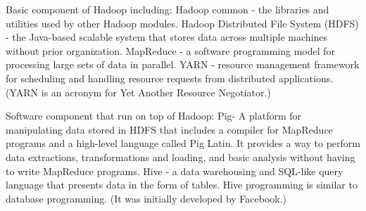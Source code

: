 Basic component of Hadoop including:
Hadoop common - the libraries and utilities used by other Hadoop modules.
Hadoop Distributed File System (HDFS) - the Java-based scalable system that stores data across multiple machines without prior organization.
MapReduce - a software programming model for processing large sets of data in parallel.
YARN - resource management framework for scheduling and handling resource requests from distributed applications. (YARN is an acronym for Yet Another Resource Negotiator.)

Software component that run on top of Hadoop:
Pig-  A platform for manipulating data stored in HDFS that includes a compiler for MapReduce programs and a high-level language called Pig Latin. It provides a way to perform data extractions, transformations and loading, and basic analysis without having to write MapReduce programs.
Hive - a data warehousing and SQL-like query language that presents data in the form of tables. Hive programming is similar to database programming. (It was initially developed by Facebook.)


